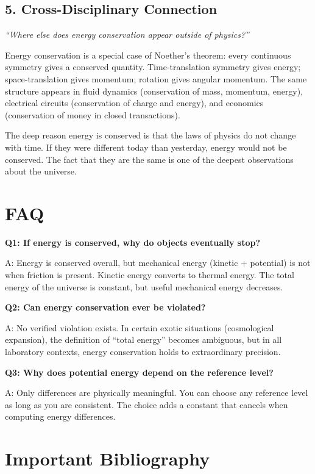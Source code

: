 \subsection*{5. Cross-Disciplinary Connection}
\textit{``Where else does energy conservation appear outside of physics?''}

Energy conservation is a special case of Noether's theorem: every continuous symmetry gives a conserved quantity. Time-translation symmetry gives energy; space-translation gives momentum; rotation gives angular momentum. The same structure appears in fluid dynamics (conservation of mass, momentum, energy), electrical circuits (conservation of charge and energy), and economics (conservation of money in closed transactions).

The deep reason energy is conserved is that the laws of physics do not change with time. If they were different today than yesterday, energy would not be conserved. The fact that they are the same is one of the deepest observations about the universe.


\section*{FAQ}

\textbf{Q1: If energy is conserved, why do objects eventually stop?}

A: Energy is conserved overall, but mechanical energy (kinetic + potential) is not when friction is present. Kinetic energy converts to thermal energy. The total energy of the universe is constant, but useful mechanical energy decreases.

\textbf{Q2: Can energy conservation ever be violated?}

A: No verified violation exists. In certain exotic situations (cosmological expansion), the definition of ``total energy'' becomes ambiguous, but in all laboratory contexts, energy conservation holds to extraordinary precision.

\textbf{Q3: Why does potential energy depend on the reference level?}

A: Only differences are physically meaningful. You can choose any reference level as long as you are consistent. The choice adds a constant that cancels when computing energy differences.
\section*{Important Bibliography}

